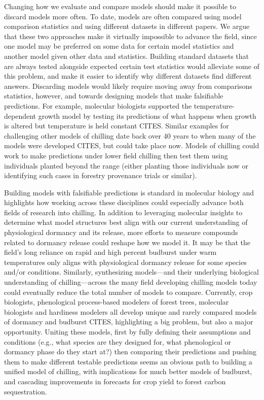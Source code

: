 \documentclass[11pt]{article}
\begin{document}
Changing how we evaluate and compare models should make it possible to discard models more often. To date, models are often compared using model comparison statistics and using different datasets in different papers. We argue that these two approaches make it virtually impossible to advance the field, since one model may be preferred on some data for certain model statistics and another model given other data and statistics. Building standard datasets that are always tested alongside expected certain test statistics would alleviate some of this problem, and make it easier to identify why different datasets find different answers. Discarding models would likely require moving away from comparisons statistics, however, and towards designing models that make falsifiable predictions. For example, molecular biologists supported the temperature-dependent growth model by testing its predictions of what happens when growth is altered but temperature is held constant CITES. Similar examples for challenging other models of chilling date back over 40 years to when many of the models were developed CITES, but could take place now. Models of chilling could work to make predictions under lower field chilling then test them using individuals planted beyond the range (either planting those individuals now or identifying such cases in forestry provenance trials or similar). 

Building models with falsifiable predictions is standard in molecular biology and highlights how working across these disciplines could especially advance both fields of research into chilling. In addition to leveraging molecular insights to determine what model structures best align with our current understanding of physiological dormancy and its release, more efforts to measure compounds related to dormancy release could reshape how we model it. It may be that the field's long reliance on rapid and high percent budburst under warm temperatures only aligns with physiological dormancy release for some species and/or conditions. Similarly, synthesizing models---and their underlying biological understanding of chilling---across the many field developing chilling models today could eventually reduce the total number of models to compare. Currently, crop biologists, phenological process-based modelers of forest trees, molecular biologists and hardiness modelers all develop unique and rarely compared models of dormancy and budburst CITES, highlighting a big problem, but also a major opportunity. Uniting these models, first by fully defining their assumptions and conditions (e.g., what species are they designed for, what phenological or dormancy phase do they start at?) then comparing their predictions and pushing them to make different testable predictions seems an obvious path to building a unified model of chilling, with implications for much better models of budburst, and cascading improvements in forecasts for crop yield to forest carbon sequestration. 
\end{document}
